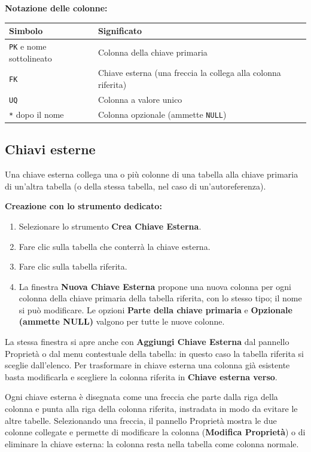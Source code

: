 \documentclass[a4paper,11pt]{article}
\newcommand{\uielement}[1]{\textbf{#1}}
\begin{document}
\textbf{Notazione delle colonne:}
\begin{center}
\begin{tabular}{@{}ll@{}}
  \toprule
  \textbf{Simbolo} & \textbf{Significato} \\
  \midrule
  \texttt{PK} e nome sottolineato & Colonna della chiave primaria \\
  \texttt{FK} & Chiave esterna (una freccia la collega alla colonna riferita) \\
  \texttt{UQ} & Colonna a valore unico \\
  \texttt{*} dopo il nome & Colonna opzionale (ammette \texttt{NULL}) \\
  \bottomrule
\end{tabular}
\end{center}

\subsection{Chiavi esterne}

Una chiave esterna collega una o più colonne di una tabella alla chiave primaria di un'altra
tabella (o della stessa tabella, nel caso di un'autoreferenza).

\textbf{Creazione con lo strumento dedicato:}
\begin{enumerate}
  \item Selezionare lo strumento \uielement{Crea Chiave Esterna}.
  \item Fare clic sulla tabella che conterrà la chiave esterna.
  \item Fare clic sulla tabella riferita.
  \item La finestra \uielement{Nuova Chiave Esterna} propone una nuova colonna per ogni colonna
        della chiave primaria della tabella riferita, con lo stesso tipo; il nome si può
        modificare. Le opzioni \uielement{Parte della chiave primaria} e
        \uielement{Opzionale (ammette NULL)} valgono per tutte le nuove colonne.
\end{enumerate}

La stessa finestra si apre anche con \uielement{Aggiungi Chiave Esterna} dal pannello Proprietà o
dal menu contestuale della tabella: in questo caso la tabella riferita si sceglie dall'elenco.
Per trasformare in chiave esterna una colonna già esistente basta modificarla e scegliere la
colonna riferita in \uielement{Chiave esterna verso}.

Ogni chiave esterna è disegnata come una freccia che parte dalla riga della colonna e punta alla
riga della colonna riferita, instradata in modo da evitare le altre tabelle. Selezionando una
freccia, il pannello Proprietà mostra le due colonne collegate e permette di modificare la
colonna (\uielement{Modifica Proprietà}) o di eliminare la chiave esterna: la colonna resta nella
tabella come colonna normale.
\end{document}
